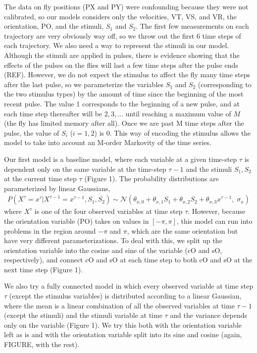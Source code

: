 \documentclass{article} %
\begin{document}
The data on fly positions (PX and PY) were confounding because they were not calibrated, so our models considers only the velocities, VT, VS, and VR, the orientation, PO, and the stimuli, $S_1$ and $S_2$. The first few measurements on each trajectory are very obviously way off, so we throw out the first 6 time steps of each trajectory. We also need a way to represent the stimuli in our model. Although the stimuli are applied in pulses, there is evidence showing that the effects of the pulses on the flies will last a few time steps after the pulse ends (REF). However, we do not expect the stimulus to affect the fly many time steps after the last pulse, so we parameterize the variables $S_1$ and $S_2$ (corresponding to the two stimulus types) by the amount of time since the beginning of the most recent pulse. The value 1 corresponds to the beginning of a new pulse, and at each time step thereafter will be $2, 3, \ldots$ until reaching a maximum value of $M$ (the fly has limited memory after all). Once we are past M time steps after the pulse, the value of $S_i$ ($i=1,2$) is $0$. This way of encoding the stimulus allows the model to take into account an M-order Markovity of the time series.

Our first model is a baseline model, where each variable at a given time-step $\tau$ is dependent only on the same variable at the time-step $\tau-1$ and the stimuli $S_1, S_2$ at the current time step $\tau$ (Figure 1). The probability distributions are parameterized by linear Gaussians,
\begin{eqnarray}
P(X^{\tau} = x^{\tau} | X^{\tau-1}=x^{\tau-1}, S_1, S_2) \sim \mathcal{N}\left( \theta_{x,0} + \theta_{x,1}S_1 + \theta_{x,2}S_2 + \theta_{x,3}x^{\tau-1}, \; \sigma_x \right)
\end{eqnarray}
where $X^{\tau}$ is one of the four observed variables at time step $\tau$.
However, because the orientation variable (PO) takes on values in $[-\pi,\pi]$, this model can run into problems in the region around $-\pi$ and $\pi$, which are the same orientation but have very different parameterizations. To deal with this, we split up the orientation variable into the cosine and sine of the variable (cO and sO, respectively), and connect cO and sO at each time step to both cO and sO at the next time step (Figure 1).

We also try a fully connected model in which every observed variable at time step $\tau$ (except the stimulus variables) is distributed according to a linear Gaussian, where the mean is a linear combination of all the observed variables at time $\tau-1$ (except the stimuli) and the stimuli variable at time $\tau$ and the variance depends only on the variable (Figure 1). We try this both with the orientation variable left as is and with the orientation variable split into its sine and cosine (again, FIGURE, with the rest).
\end{document}
